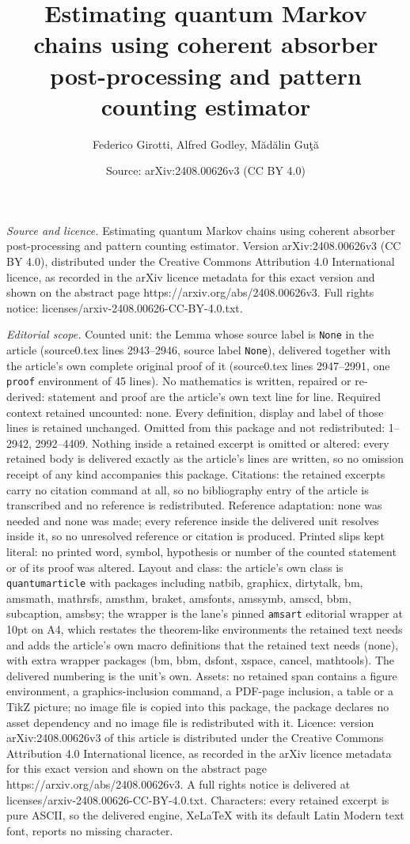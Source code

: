 \documentclass[10pt,a4paper]{amsart}
\title[Estimating quantum Markov chains using coherent absorber pos]{Estimating quantum Markov chains using coherent absorber post-processing and pattern counting estimator}
\author{Federico Girotti, Alfred Godley, M\u{a}d\u{a}lin Gu\c{t}\u{a}}
\date{Source: arXiv:2408.00626v3 (CC BY 4.0)}
\begin{document}
\maketitle

\noindent\emph{Source and licence.} Estimating quantum Markov chains using coherent absorber post-processing and pattern counting estimator. Version arXiv:2408.00626v3 (CC BY 4.0), distributed under the Creative Commons Attribution 4.0 International licence, as recorded in the arXiv licence metadata for this exact version and shown on the abstract page https://arxiv.org/abs/2408.00626v3. Full rights notice: licenses/arxiv-2408.00626-CC-BY-4.0.txt.\par\smallskip

\noindent\textit{Editorial scope.} Counted unit: the Lemma whose source label is \texttt{None} in the article (source0.tex lines 2943--2946, source label \texttt{None}), delivered together with the article's own complete original proof of it (source0.tex lines 2947--2991, one \texttt{proof} environment of 45 lines). No mathematics is written, repaired or re-derived: statement and proof are the article's own text line for line. Required context retained uncounted: none. Every definition, display and label of those lines is retained unchanged. Omitted from this package and not redistributed: 1--2942, 2992--4409. Nothing inside a retained excerpt is omitted or altered: every retained body is delivered exactly as the article's lines are written, so no omission receipt of any kind accompanies this package. Citations: the retained excerpts carry no citation command at all, so no bibliography entry of the article is transcribed and no reference is redistributed. Reference adaptation: none was needed and none was made; every reference inside the delivered unit resolves inside it, so no unresolved reference or citation is produced. Printed slips kept literal: no printed word, symbol, hypothesis or number of the counted statement or of its proof was altered. Layout and class: the article's own class is \texttt{quantumarticle} with packages including natbib, graphicx, dirtytalk, bm, amsmath, mathrsfs, amsthm, braket, amsfonts, amssymb, amscd, bbm, subcaption, amsbsy; the wrapper is the lane's pinned \texttt{amsart} editorial wrapper at 10pt on A4, which restates the theorem-like environments the retained text needs and adds the article's own macro definitions that the retained text needs (none), with extra wrapper packages (bm, bbm, dsfont, xspace, cancel, mathtools). The delivered numbering is the unit's own. Assets: no retained span contains a figure environment, a graphics-inclusion command, a PDF-page inclusion, a table or a TikZ picture; no image file is copied into this package, the package declares no asset dependency and no image file is redistributed with it. Licence: version arXiv:2408.00626v3 of this article is distributed under the Creative Commons Attribution 4.0 International licence, as recorded in the arXiv licence metadata for this exact version and shown on the abstract page https://arxiv.org/abs/2408.00626v3. A full rights notice is delivered at licenses/arxiv-2408.00626-CC-BY-4.0.txt. Characters: every retained excerpt is pure ASCII, so the delivered engine, XeLaTeX with its default Latin Modern text font, reports no missing character.
\end{document}

